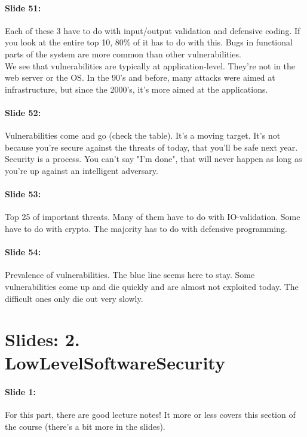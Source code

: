 \documentclass[10pt,a4paper]{report}
\begin{document}
\paragraph{Slide 51:} Each of these 3 have to do with input/output validation and defensive coding. If you look at the entire top 10, 80\% of it has to do with this. Bugs in functional parts of the system are more common than other vulnerabilities.\\
We see that vulnerabilities are typically at application-level. They're not in the web server or the OS. In the 90's and before, many attacks were aimed at infrastructure, but since the 2000's, it's more aimed at the applications.

\paragraph{Slide 52:} Vulnerabilities come and go (check the table). It's a moving target. It's not because you're secure against the threats of today, that you'll be safe next year. Security is a process. You can't say "I'm done", that will never happen as long as you're up against an intelligent adversary.

\paragraph{Slide 53:} Top 25 of important threats. Many of them have to do with IO-validation. Some have to do with crypto. The majority has to do with defensive programming.

\paragraph{Slide 54:} Prevalence of vulnerabilities. The blue line seems here to stay. Some vulnerabilities come up and die quickly and are almost not exploited today. The difficult ones only die out very slowly.

\section{Slides: 2. LowLevelSoftwareSecurity}

\paragraph{Slide 1:} For this part, there are good lecture notes! It more or less covers this section of the course (there's a bit more in the slides).
\end{document}

